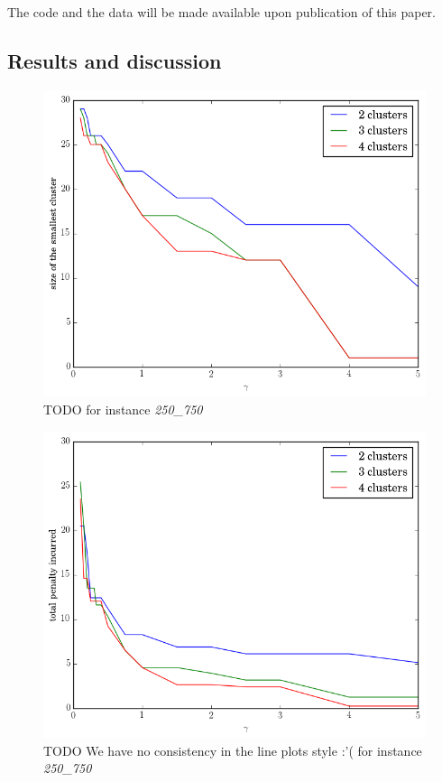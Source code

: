 \documentclass[conference]{IEEEtran}
\begin{document}


The code and the data will be made available upon publication of this paper.

\subsection{Results and discussion}


\begin{figure}
\centering
\includegraphics[scale=0.4]{images/gamma_smallest_cluster_size}
\captionsetup{font=small}
\caption{TODO for instance \emph{250\_750}}
\label{fig:gamma_cluster}
\end{figure}

\begin{figure}
\centering
\includegraphics[scale=0.4]{images/gamma_total_penalty_incurred}
\captionsetup{font=small}
\caption{TODO We have no consistency in the line plots style :'( for instance \emph{250\_750}}
\label{fig:gamma_penalty}
\end{figure}
\end{document}
